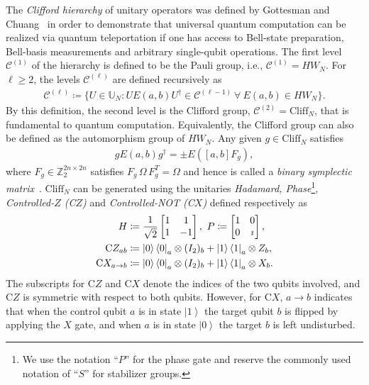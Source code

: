 \documentclass[twoside,romanappendices]{IEEEtran}
\newcommand{\ket}[1]{\left\lvert #1 \right\rangle}
\begin{document}
The \emph{Clifford hierarchy} of unitary operators was defined by Gottesman and Chuang~\cite{Gottesman-nature99} in order to demonstrate that universal quantum computation can be realized via quantum teleportation if one has access to Bell-state preparation, Bell-basis measurements and arbitrary single-qubit operations.
The first level $\mathcal{C}^{(1)}$ of the hierarchy is defined to be the Pauli group, i.e., $\mathcal{C}^{(1)} = HW_N$.
For $\ell \geq 2$, the levels $\mathcal{C}^{(\ell)}$ are defined recursively as
\begin{align}
\mathcal{C}^{(\ell)} \coloneqq \{ U \in \mathbb{U}_N \colon U E(a,b) U^{\dagger} \in \mathcal{C}^{(\ell - 1)}\ \forall\ E(a,b) \in HW_N \}.
\end{align}
By this definition, the second level is the Clifford group, $\mathcal{C}^{(2)} = \text{Cliff}_N$, that is fundamental to quantum computation.
Equivalently, the Clifford group can also be defined as the automorphism group of $HW_N$.
Any given $g \in \text{Cliff}_N$ satisfies
\begin{align}
\label{eq:cliff_action}
g E(a,b) g^{\dagger} = \pm E([a,b] F_g),
\end{align}
where $F_g \in \mathbb{Z}_2^{2n \times 2n}$ satisfies $F_g\, \Omega\, F_g^T = \Omega$ and hence is called a \emph{binary symplectic matrix}~\cite{Rengaswamy-arxiv18}.
$\text{Cliff}_N$ can be generated using the unitaries \emph{Hadamard, Phase}\footnote{We use the notation ``$P$'' for the phase gate and reserve the commonly used notation of ``$S$'' for stabilizer groups.}, \emph{Controlled-$Z$ (C$Z$)} and \emph{Controlled-NOT (C$X$)} defined respectively as
\begin{align}
H & \coloneqq \frac{1}{\sqrt{2}}
\begin{bmatrix}
1 & 1 \\
1 & -1
\end{bmatrix}, \ 
P \coloneqq 
\begin{bmatrix}
1 & 0 \\
0 & \imath
\end{bmatrix}, \nonumber \\
% 
\text{C}Z_{ab} & \coloneqq \ketbra{0}_a \otimes (I_2)_b + \ketbra{1}_a \otimes Z_b, \nonumber \\ 
\text{C}X_{a \rightarrow b} & \coloneqq \ketbra{0}_a \otimes (I_2)_b + \ketbra{1}_a \otimes X_b.
\end{align}
The subscripts for C$Z$ and C$X$ denote the indices of the two qubits involved, and C$Z$ is symmetric with respect to both qubits. 
However, for C$X$, $a \rightarrow b$ indicates that when the control qubit $a$ is in state $\ket{1}$ the target qubit $b$ is flipped by applying the $X$ gate, and when $a$ is in state $\ket{0}$ the target $b$ is left undisturbed.
\end{document}
